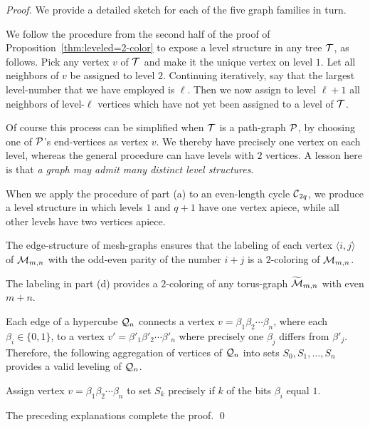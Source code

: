 \begin{proof}
We provide a detailed sketch for each of the five graph families in turn.

We follow the procedure from the second half of the proof of
Proposition~\ref{thm:leveled=2-color} to expose a level structure in
any tree $\mbox{$\cal T$}$, as follows.  Pick any vertex $v$ of $\mbox{$\cal T$}$ and make it the
unique vertex on level $1$.  Let all neighbors of $v$ be assigned to
level $2$.  Continuing iteratively, say that the largest level-number
that we have employed is $\ell$.  Then we now assign to level $\ell
+1$ all neighbors of level-$\ell$ vertices which have not yet been
assigned to a level of $\mbox{$\cal T$}$.

Of course this process can be simplified when $\mbox{$\cal T$}$ is a path-graph
$\mbox{$\cal P$}$, by choosing one of $\mbox{$\cal P$}$'s end-vertices as vertex $v$.  We thereby
have precisely one vertex on each level, whereas the general procedure
can have levels with $2$ vertices.  A lesson here is that {\em a graph
  may admit many distinct level structures}.

\medskip

When we apply the procedure of part (a) to an even-length cycle
$\mbox{$\cal C$}_{2q}$, we produce a level structure in which levels $1$ and $q+1$
have one vertex apiece, while all other levels have two vertices apiece.

\medskip

The edge-structure of mesh-graphs ensures that the labeling of each
vertex $\langle i,j \rangle$ of $\mbox{$\cal M$}_{m,n}$ with the odd-even parity of
the number $i+j$ is a $2$-coloring of $\mbox{$\cal M$}_{m,n}$.

\medskip

The labeling in part (d) provides a $2$-coloring of any torus-graph
$\widetilde{\mbox{$\cal M$}}_{m,n}$ with even $m+n$.

\medskip

Each edge of a hypercube $\mbox{$\cal Q$}_n$ connects a vertex $v = \beta_1 \beta_2
\cdots \beta_n$, where each $\beta_i \in \{0,1\}$, to a vertex $v' =
\beta'_1 \beta'_2 \cdots \beta'_n$ where precisely one $\beta_j$
differs from $\beta'_j$.  Therefore, the following aggregation of
vertices of $\mbox{$\cal Q$}_n$ into sets $S_0, S_1, \ldots, S_n$ provides a valid
leveling of $\mbox{$\cal Q$}_n$.

\smallskip

Assign vertex $v = \beta_1 \beta_2 \cdots \beta_n$ to set $S_k$
precisely if $k$ of the bits $\beta_i$ equal $1$.

\medskip

\noindent
The preceding explanations complete the proof.
\qed
\end{proof}

